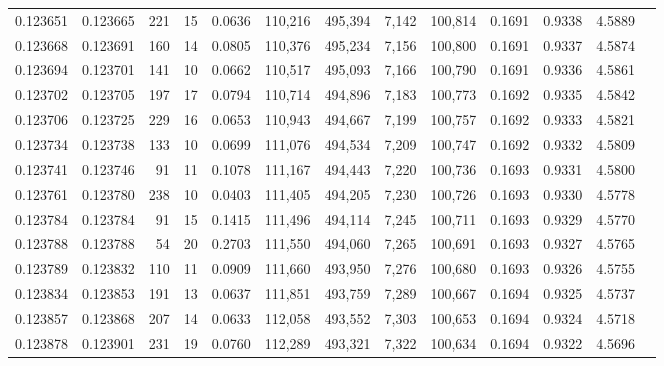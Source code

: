 \begin{tabular}{rrrrrrrrrrrrr}
0.123651 & 0.123665 &   221 &  15 &                                     0.0636 & 110,216 & 495,394 &   7,142 & 100,814 & 0.1691 & 0.9338 & 4.5889 \\
0.123668 & 0.123691 &   160 &  14 &                                     0.0805 & 110,376 & 495,234 &   7,156 & 100,800 & 0.1691 & 0.9337 & 4.5874 \\
0.123694 & 0.123701 &   141 &  10 &                                     0.0662 & 110,517 & 495,093 &   7,166 & 100,790 & 0.1691 & 0.9336 & 4.5861 \\
0.123702 & 0.123705 &   197 &  17 &                                     0.0794 & 110,714 & 494,896 &   7,183 & 100,773 & 0.1692 & 0.9335 & 4.5842 \\
0.123706 & 0.123725 &   229 &  16 &                                     0.0653 & 110,943 & 494,667 &   7,199 & 100,757 & 0.1692 & 0.9333 & 4.5821 \\
0.123734 & 0.123738 &   133 &  10 &                                     0.0699 & 111,076 & 494,534 &   7,209 & 100,747 & 0.1692 & 0.9332 & 4.5809 \\
0.123741 & 0.123746 &    91 &  11 &                                     0.1078 & 111,167 & 494,443 &   7,220 & 100,736 & 0.1693 & 0.9331 & 4.5800 \\
0.123761 & 0.123780 &   238 &  10 &                                     0.0403 & 111,405 & 494,205 &   7,230 & 100,726 & 0.1693 & 0.9330 & 4.5778 \\
0.123784 & 0.123784 &    91 &  15 &                                     0.1415 & 111,496 & 494,114 &   7,245 & 100,711 & 0.1693 & 0.9329 & 4.5770 \\
0.123788 & 0.123788 &    54 &  20 &                                     0.2703 & 111,550 & 494,060 &   7,265 & 100,691 & 0.1693 & 0.9327 & 4.5765 \\
0.123789 & 0.123832 &   110 &  11 &                                     0.0909 & 111,660 & 493,950 &   7,276 & 100,680 & 0.1693 & 0.9326 & 4.5755 \\
0.123834 & 0.123853 &   191 &  13 &                                     0.0637 & 111,851 & 493,759 &   7,289 & 100,667 & 0.1694 & 0.9325 & 4.5737 \\
0.123857 & 0.123868 &   207 &  14 &                                     0.0633 & 112,058 & 493,552 &   7,303 & 100,653 & 0.1694 & 0.9324 & 4.5718 \\
0.123878 & 0.123901 &   231 &  19 &                                     0.0760 & 112,289 & 493,321 &   7,322 & 100,634 & 0.1694 & 0.9322 & 4.5696 \\

\end{tabular}
